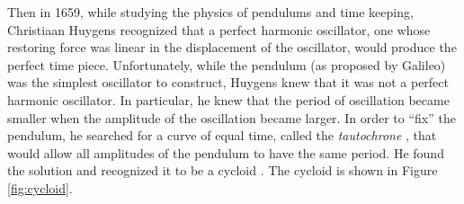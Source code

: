 \documentclass{article}
\theoremstyle{definition}
\begin{document}
\noindent
Then in 1659, while studying the physics of pendulums and time
keeping, Christiaan Huygens \cite{wiki:huygens} recognized that a
perfect harmonic oscillator, one whose restoring force was linear
in the displacement of the oscillator, would produce the perfect
time piece. Unfortunately, while the pendulum (as proposed by
Galileo) was the simplest oscillator to construct, Huygens knew
that it was not a perfect harmonic oscillator. In particular, he
knew that the period of oscillation became smaller when the
amplitude of the oscillation became larger. In order to “fix” the
pendulum, he searched for a curve of equal time, called the
\emph{tautochrone} \cite{wiki:tautochrone}, that would allow all
amplitudes of the pendulum to have the same period. He found the
solution and recognized it to be a cycloid \cite{wiki:cycloid}. 
The cycloid is shown in Figure \ref{fig:cycloid}.
\end{document}
